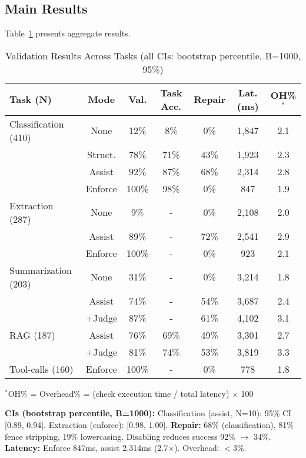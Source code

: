 \documentclass[sigconf]{acmart}
\begin{document}
\subsection{Main Results}

Table~\ref{tab:results} presents aggregate results.

\begin{table}[H]
\centering
\caption{Validation Results Across Tasks (all CIs: bootstrap percentile, B=1000, 95\%)}
\label{tab:results}
\scriptsize
\begin{tabular}{@{}lcccccc@{}}
\toprule
\textbf{Task (N)} & \textbf{Mode} & \textbf{Val.} & \textbf{Task Acc.} & \textbf{Repair} & \textbf{Lat. (ms)} & \textbf{OH\%}\(^*\) \\
\midrule
Classification (410) & None & 12\% & 8\% & 0\% & 1,847 & 2.1 \\
 & Struct. & 78\% & 71\% & 43\% & 1,923 & 2.3 \\
 & Assist & 92\% & 87\% & 68\% & 2,314 & 2.8 \\
 & Enforce & 100\% & 98\% & 0\% & 847 & 1.9 \\
\midrule
Extraction (287) & None & 9\% & - & 0\% & 2,108 & 2.0 \\
 & Assist & 89\% & - & 72\% & 2,541 & 2.9 \\
 & Enforce & 100\% & - & 0\% & 923 & 2.1 \\
\midrule
Summarization (203) & None & 31\% & - & 0\% & 3,214 & 1.8 \\
 & Assist & 74\% & - & 54\% & 3,687 & 2.4 \\
 & +Judge & 87\% & - & 61\% & 4,102 & 3.1 \\
\midrule
RAG (187) & Assist & 76\% & 69\% & 49\% & 3,301 & 2.7 \\
 & +Judge & 81\% & 74\% & 53\% & 3,819 & 3.3 \\
Tool-calls (160) & Enforce & 100\% & - & 0\% & 778 & 1.8 \\
\bottomrule
\end{tabular}
\vspace{1mm}
\scriptsize\(^*\)OH\% = Overhead\% = (check execution time / total latency) \(\times\) 100
\end{table}

\textbf{CIs (bootstrap percentile, B=1000):} Classification (assist, N=10): 95\% CI [0.89, 0.94]. Extraction (enforce): [0.98, 1.00]. \textbf{Repair:} 68\% (classification), 81\% fence stripping, 19\% lowercasing. Disabling reduces success 92\% \(\to\) 34\%. \textbf{Latency:} Enforce 847ms, assist 2,314ms (2.7\(\times\)). Overhead: \(<\)3\%.
\end{document}

